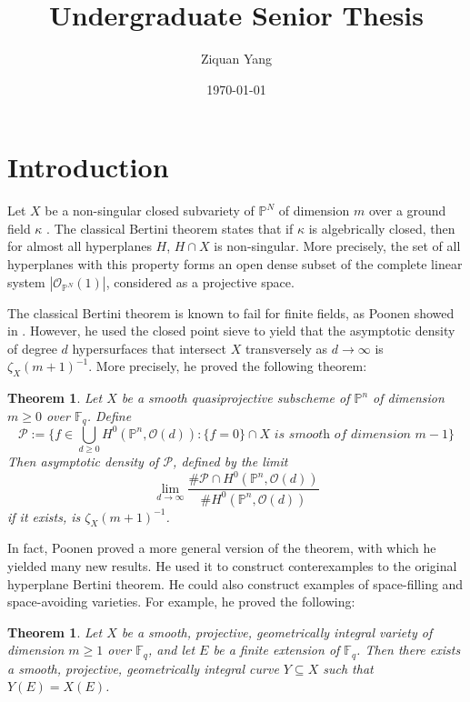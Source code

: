 \documentclass[12pt]{article}
\theoremstyle{plain}
\newtheorem{theorem}[equation]{Theorem}
\theoremstyle{definition}
\newcommand{\IF}{\mathbb{F}}
\newcommand{\IP}{\mathbb{P}}
\newcommand{\sO}{\mathcal{O}}
\newcommand{\sP}{\mathcal{P}}
\newcommand\union{\bigcup}
\newcommand{\<}{\langle}
\renewcommand{\>}{\rangle}
\begin{document}
%
\title{Undergraduate Senior Thesis}
\author{Ziquan Yang}
\date{\today}

\maketitle

\tableofcontents

\section{Introduction}
Let $X$ be a non-singular closed subvariety of $\IP^N$ of dimension $m$ over a ground field $\kappa$ . The classical Bertini theorem states that if $\kappa$ is algebrically closed, then for almost all hyperplanes $H$, $H \cap X$ is non-singular. More precisely, the set of all hyperplanes with this property forms an open dense subset of the complete linear system $|\sO_{\IP^N}(1)|$, considered as a projective space.  

The classical Bertini theorem is known to fail for finite fields, as Poonen showed in \cite{Poonen}. However, he used the closed point sieve to yield that the asymptotic density of degree $d$ hypersurfaces that intersect $X$ transversely as $d \to \infty$ is $\zeta_{X}(m + 1)^{-1}$. More precisely, he proved the following theorem:
\begin{theorem}
Let $X$ be a smooth quasiprojective subscheme of $\IP^n$ of dimension $m \ge 0$ over $\IF_q$. Define 
$$ \sP := \{ f \in \union_{d \ge 0} H^0(\IP^n, \sO(d)) : \{ f = 0 \} \cap X \textit{ is smooth of dimension } m - 1 \}$$
Then asymptotic density of $\sP$, defined by the limit
$$ \lim_{d \to \infty} \frac{\# \sP \cap H^0(\IP^n, \sO(d))}{\# H^0(\IP^n, \sO(d))}$$
if it exists, is $\zeta_X(m + 1)^{-1}$. 
\end{theorem}

In fact, Poonen proved a more general version of the theorem, with which he yielded many new results. He used it to construct conterexamples to the original hyperplane Bertini theorem. He could also construct examples of space-filling and space-avoiding varieties. For example, he proved the following:

\begin{theorem}
Let $X$ be a smooth, projective, geometrically integral variety of dimension $m \ge 1$ over $\IF_q$, and let $E$ be a finite extension of $\IF_q$. Then there exists
a smooth, projective, geometrically integral curve $Y \subseteq X$ such that $Y(E) = X(E)$.
\end{theorem}
\end{document}
